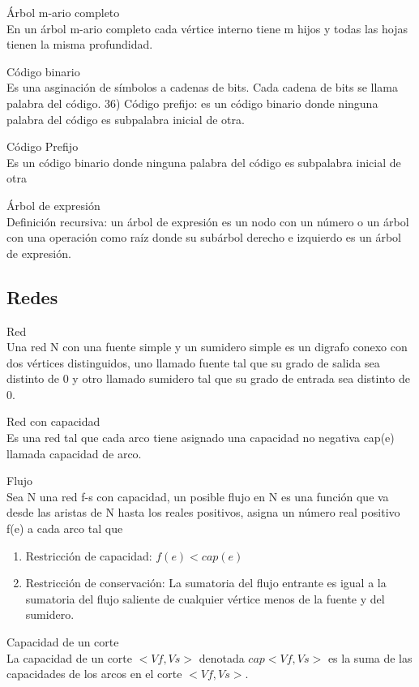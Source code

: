 \documentclass{article}
\begin{document}
\begin{defn}
Árbol m-ario completo \\ En un árbol m-ario completo cada vértice interno tiene m hijos y todas las hojas tienen la misma profundidad.
\end{defn}

\begin{defn}
Código binario \\ Es una asginación de símbolos a cadenas de bits. Cada cadena de bits se llama palabra del código. 36) Código prefijo: es un código binario donde ninguna palabra del código es subpalabra inicial de otra.
\end{defn}
\begin{defn}
Código Prefijo \\ Es un código binario donde ninguna palabra del código es subpalabra inicial de otra
\end{defn}
\begin{defn}
Árbol de expresión \\Definición recursiva: un árbol de expresión es un nodo con un número o un árbol con una operación como raíz donde su subárbol derecho e izquierdo es un árbol de expresión.
\end{defn}

\subsection{Redes}
\begin{defn}
 Red \\ Una red N con una fuente simple y un sumidero simple es un digrafo conexo con dos vértices distinguidos, uno llamado fuente tal que su grado de salida sea distinto de 0 y otro llamado sumidero tal que su grado de entrada sea distinto de 0. 
\end{defn}
\begin{defn}
Red con capacidad \\ Es una red tal que cada arco tiene asignado una capacidad no negativa cap(e) llamada capacidad de arco.
\end{defn}
\begin{defn}
Flujo \\ Sea N una red f-s con capacidad, un posible flujo en N es una función que va desde las aristas de N hasta los reales positivos, asigna un número real positivo f(e) a cada arco tal que
\begin{enumerate}
    \item Restricción de capacidad: $f(e)<cap(e)$
    \item Restricción de conservación: La sumatoria del flujo entrante es igual a la sumatoria del flujo saliente de cualquier vértice menos de la fuente y del sumidero.
\end{enumerate}
\end{defn}
\begin{defn}
Capacidad de un corte \\ La capacidad de un corte $<Vf,Vs>$ denotada $cap<Vf,Vs>$ es la suma de las capacidades de los arcos en el corte $<Vf,Vs>$.
\end{defn}
\pagebreak
\end{document}
